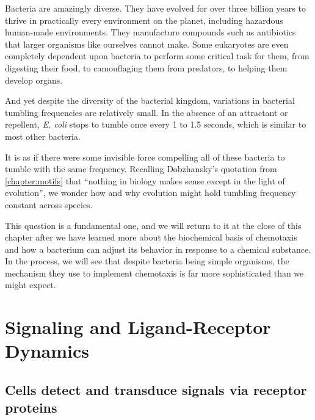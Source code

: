Bacteria are amazingly diverse. They have evolved for over three billion years to thrive in practically every environment on the planet, including hazardous human-made environments. They manufacture compounds such as antibiotics that larger organisms like ourselves cannot make. Some eukaryotes are even completely dependent upon bacteria to perform some critical task for them, from digesting their food, to camouflaging them from predators, to helping them develop organs.

And yet despite the diversity of the bacterial kingdom, variations in bacterial tumbling frequencies are relatively small. In the absence of an attractant or repellent, \textit{E. coli} stops to tumble once every 1 to 1.5 seconds, which is similar to most other bacteria.

It is as if there were some invisible force compelling all of these bacteria to tumble with the same frequency. Recalling Dobzhansky's quotation from \autoref{chapter:motifs} that ``nothing in biology makes sense except in the light of evolution'', we wonder how and why evolution might hold tumbling frequency constant across species.

This question is a fundamental one, and we will return to it at the close of this chapter after we have learned more about the biochemical basis of chemotaxis and how a bacterium can adjust its behavior in response to a chemical substance. In the process, we will see that despite bacteria being simple organisms, the mechanism they use to implement chemotaxis is far more sophisticated than we might expect.\\

\begin{qbox}\end{qbox}


\FloatBarrier
{}
\section{Signaling and Ligand-Receptor Dynamics}
\label{sec:signal}

\subsection{Cells detect and transduce signals via receptor proteins}

